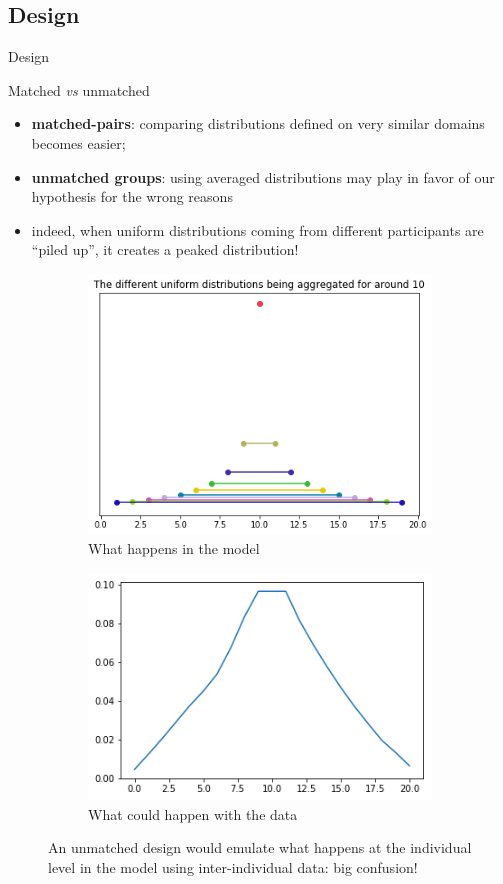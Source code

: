 \documentclass[xcolor=table, hyperref={pdfpagelabels=false}]{beamer}
\newcommand\SmallCaption[1]{%
	\captionsetup{font=scriptsize}%
	\caption{#1}}
\begin{document}
\subsection{Design}
\begin{frame}{Design}
\begin{block}{Matched \textit{vs} unmatched}
	\begin{itemize}
		\item \textbf{matched-pairs}: comparing distributions defined on very similar domains becomes easier;
		\item \textbf{unmatched groups}: using averaged distributions may play in favor of our hypothesis for the wrong reasons
		\item indeed, when uniform distributions coming from different participants are ``piled up'', it creates a peaked distribution! 
	\end{itemize}
\end{block}
\begin{figure}
	\centering
	\begin{subfigure}[t]{.45\textwidth}
		\centering
		\includegraphics[width=.6\textwidth]{./images/around_10_prob_simple_aggregate.png}
		\SmallCaption{What happens in the model}
	\end{subfigure}
	\begin{subfigure}[t]{.45\textwidth}
		\centering
		\includegraphics[width=.6\textwidth]{./images/sim_aggregated_mildly_peaked.png}
		\SmallCaption{What could happen with the data}
	\end{subfigure}
	\SmallCaption{An unmatched design would emulate what happens at the individual level in the model using inter-individual data: big confusion!}
\end{figure}
\end{frame}
\end{document}
